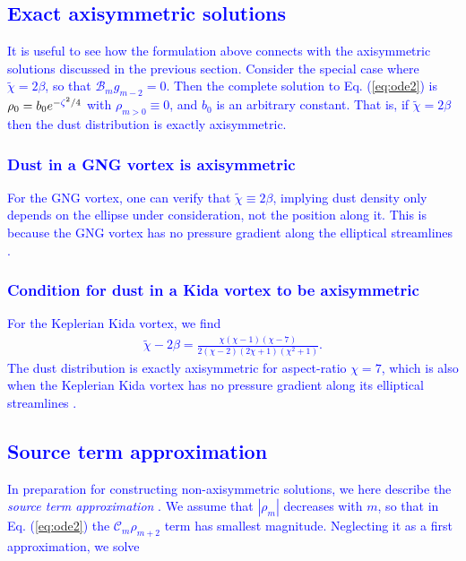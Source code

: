 \documentclass[apj]{emulateapj}
\def\blue#1{\textcolor{blue}{ #1}}
\newcommand{\Eq}[1]{Eq. (\ref{#1})}
\newcommand{\eq}[1]{\Eq{#1}}
\newcommand{\tilchi}{\tilde\chi}
\begin{document}
\blue{
\subsection{Exact axisymmetric solutions}
It is useful to see how the formulation above connects with the  axisymmetric solutions discussed in the previous section.  Consider the special case where $\tilchi = 2\beta$, so that 
$\mathcal{B}_mg_{m-2} = 0.$
Then the complete solution to \eq{eq:ode2} is $\rho_0 = b_0e^{-\blue{\zeta}^2/4}$ with $\rho_{m>0} \equiv 0$, and $b_0$ is an arbitrary constant. That is, if $\tilchi=2\beta$ then the dust distribution is exactly axisymmetric. 
}
\blue{
\subsubsection{Dust in a GNG vortex is axisymmetric}
For the GNG vortex, one can verify that $\tilchi\equiv 2\beta$, implying dust density only depends on the ellipse under consideration, not the position along it. This is because the GNG vortex has no pressure gradient along the elliptical streamlines \citep{Chang-Oishi10}. 
}
\blue{
\subsubsection{Condition for dust in a Kida vortex to be axisymmetric}
For the Keplerian Kida vortex, we find
\begin{align}
\tilchi - 2\beta = \frac{\chi(\chi-1)(\chi-7)}{2(\chi-2)(2\chi+1)(\chi^2+1)}.
\end{align}
The dust distribution is exactly axisymmetric for aspect-ratio $\chi=7$, which is also when the Keplerian Kida vortex has no pressure gradient along its elliptical streamlines \citep{Chang-Oishi10}. 
}
\blue{
\subsection{Source term approximation}
In preparation for constructing non-axisymmetric solutions, we here describe the \emph{source term approximation} \citep{Zhang06}.
We assume that $|\rho_m|$ decreases with $m$, so that in \eq{eq:ode2} the $\mathcal{C}_m\rho_{m+2}$ term has smallest magnitude.  Neglecting it as a first approximation, we solve 
}
\end{document}
